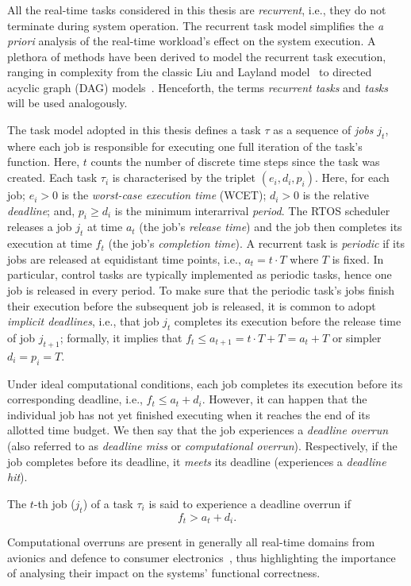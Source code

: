 \subsubsection*{}%
All the real-time tasks considered in this thesis are \emph{recurrent}, i.e., they do not terminate during system operation.
The recurrent task model simplifies the \emph{a priori} analysis of the real-time workload's effect on the system execution.
A plethora of methods have been derived to model the recurrent task execution, ranging in complexity from the classic Liu and Layland model~\cite{Liu:1973} to directed acyclic graph (DAG) models~\cite{Saifullah:2014}.
Henceforth, the terms \emph{recurrent tasks} and \emph{tasks} will be used analogously.

The task model adopted in this thesis defines a task $\tau$ as a sequence of \emph{jobs} $j_t$, where each job is responsible for executing one full iteration of the task's function.
Here, $t$ counts the number of discrete time steps since the task was created.
Each task $\tau_i$ is characterised by the triplet $(e_i, d_i, p_i)$.
Here, for each job; $e_i > 0$ is the \emph{worst-case execution time} (WCET); $d_i > 0$ is the relative \emph{deadline}; and, $p_i \geq d_i$ is the minimum interarrival \emph{period}.
The RTOS scheduler releases a job $j_t$ at time $a_t$ (the job's \emph{release time}) and the job then completes its execution at time $f_t$ (the job's \emph{completion time}).
A recurrent task is \emph{periodic} if its jobs are released at equidistant time points, i.e., $a_t = t\cdot T$ where $T$ is fixed. 
In particular, control tasks are typically implemented as periodic tasks, hence one job is released in every period.
To make sure that the periodic task's jobs finish their execution before the subsequent job is released, it is common to adopt \emph{implicit deadlines}, i.e., that job $j_t$ completes its execution before the release time of job $j_{t+1}$; formally, it implies that $f_t \leq a_{t+1} = t\cdot T+T = a_t + T$ or simpler $d_i = p_i = T$.

Under ideal computational conditions, each job completes its execution before its corresponding deadline, i.e., $f_t \leq a_t + d_i$.
However, it can happen that the individual job has not yet finished executing when it reaches the end of its allotted time budget.
We then say that the job experiences a \emph{deadline overrun} (also referred to as \emph{deadline miss} or \emph{computational overrun}).
Respectively, if the job completes before its deadline, it \emph{meets} its deadline (experiences a \emph{deadline hit}).
%
\begin{definition}%
    \label{def:kappa:overrun}%
    The $t$-th job ($j_t$) of a task $\tau_i$ is said to experience a deadline overrun if
    \begin{equation}
        f_t > a_t + d_i.
    \end{equation}
\end{definition}
%
Computational overruns are present in generally all real-time domains from avionics and defence to consumer electronics~\cite{Akesson:2020}, thus highlighting the importance of analysing their impact on the systems' functional correctness.

